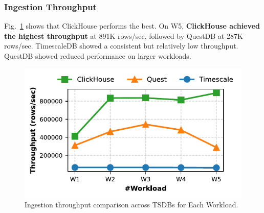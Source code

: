 \documentclass[conference]{IEEEtran}
\begin{document}
\subsubsection{Ingestion Throughput}
Fig.~\ref{fig:ingestion_throughput_comparison} shows that ClickHouse performs the best. On W5, \textbf{ClickHouse achieved the highest throughput} at 891K rows/sec, followed by QuestDB at 287K rows/sec. TimescaleDB showed a consistent but relatively low throughput. QuestDB showed reduced performance on larger workloads.
\begin{figure}[tb]
\centering
\includegraphics[width=0.8\linewidth]{2_ing_throughput_plot.pdf}
\caption{Ingestion throughput comparison across TSDBs for Each Workload.}
\label{fig:ingestion_throughput_comparison}
\end{figure}
\end{document}
